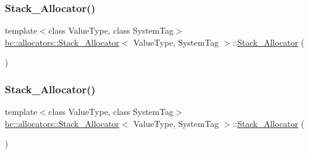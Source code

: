 \mbox{\label{classbc_1_1allocators_1_1Stack__Allocator_acc97e76a38275f8ef6274935d15428c6}} 
\subsubsection{\texorpdfstring{Stack\+\_\+\+Allocator()}{Stack\_Allocator()}\hspace{0.1cm}{\footnotesize\ttfamily [3/4]}}
{\footnotesize\ttfamily template$<$class Value\+Type, class System\+Tag$>$ \\
\hyperlink{classbc_1_1allocators_1_1Stack__Allocator}{bc\+::allocators\+::\+Stack\+\_\+\+Allocator}$<$ Value\+Type, System\+Tag $>$\+::\hyperlink{classbc_1_1allocators_1_1Stack__Allocator}{Stack\+\_\+\+Allocator} (\begin{DoxyParamCaption}\item[{const \hyperlink{classbc_1_1allocators_1_1Stack__Allocator}{Stack\+\_\+\+Allocator}$<$ Value\+Type, System\+Tag $>$ \&}]{ }\end{DoxyParamCaption})\hspace{0.3cm}{\ttfamily [default]}}

\mbox{\label{classbc_1_1allocators_1_1Stack__Allocator_a165d3b34820254f66d1b197d3208ab1e}} 
\subsubsection{\texorpdfstring{Stack\+\_\+\+Allocator()}{Stack\_Allocator()}\hspace{0.1cm}{\footnotesize\ttfamily [4/4]}}
{\footnotesize\ttfamily template$<$class Value\+Type, class System\+Tag$>$ \\
\hyperlink{classbc_1_1allocators_1_1Stack__Allocator}{bc\+::allocators\+::\+Stack\+\_\+\+Allocator}$<$ Value\+Type, System\+Tag $>$\+::\hyperlink{classbc_1_1allocators_1_1Stack__Allocator}{Stack\+\_\+\+Allocator} (\begin{DoxyParamCaption}\item[{\hyperlink{classbc_1_1allocators_1_1Stack__Allocator}{Stack\+\_\+\+Allocator}$<$ Value\+Type, System\+Tag $>$ \&\&}]{ }\end{DoxyParamCaption})\hspace{0.3cm}{\ttfamily [default]}}



